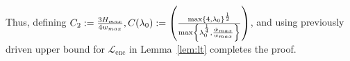 \documentclass{article}
\def\encs{u_\textrm{enc}}
\def\decs{u_\textrm{dec}}
\def\declamb{\lambda_\textrm{d}}
\def\lenc{\mathcal{L}_\textrm{enc}}
\def\stset{\mathcal{F}}
\newcommand{\norm}[1]{\left\lVert#1\right\rVert}
\newcommand{\lp}[1]{{L}^{#1}\left(\Omega; \mathbb{R}\right)}
\newcommand{\splineCC}{\mathbf{S}_{\declamb,|\stset|,2}}
\begin{document}
Thus, defining $C_2 := \frac{3H_{\textrm{max}}}{4w_{\textrm{max}}}, C(\lambda_0):=\left(\frac{\max \left\{4, \lambda_0\right\}^\frac{1}{2}}{\max\left\{\lambda_0^\frac{1}{4}, \frac{\Tilde{w}_{\textrm{max}}}{w_{\textrm{max}}} \right\}}\right)$, and using previously driven upper bound for $\lenc$ in Lemma~\ref{lem:lt}  completes the proof.
\end{document}
